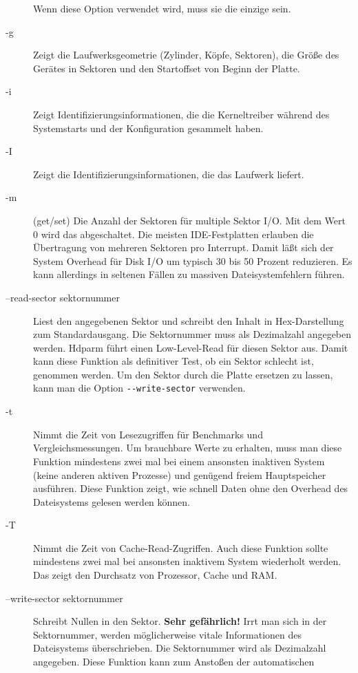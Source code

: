 \begin{normaltext}
\begin{description}
      Wenn diese Option verwendet wird, muss sie die einzige sein.
    \item[-g] Zeigt die Laufwerksgeometrie (Zylinder, Köpfe, Sektoren), die
      Größe des Gerätes in Sektoren und den Startoffset von Beginn der Platte.
    \item[-i] Zeigt Identifizierungsinformationen, die die Kerneltreiber
      während des Systemstarts und der Konfiguration gesammelt haben.
    \item[-I] Zeigt die Identifizierungsinformationen, die das Laufwerk
      liefert.
    \item[-m] (get/set) Die Anzahl der Sektoren für multiple Sektor I/O. Mit
      dem Wert 0 wird das abgeschaltet. Die meisten IDE-Festplatten erlauben
      die Übertragung von mehreren Sektoren pro Interrupt. Damit läßt sich der
      System Overhead für Disk I/O um typisch 30 bis 50 Prozent reduzieren. Es
      kann allerdings in seltenen Fällen zu massiven Dateisystemfehlern
      führen.
    \item[--read-sector sektornummer] Liest den angegebenen Sektor und
      schreibt den Inhalt in Hex-Darstellung zum Standardausgang. Die
      Sektornummer muss als Dezimalzahl angegeben werden. Hdparm führt einen
      Low-Level-Read für diesen Sektor  aus. Damit kann diese Funktion als
      definitiver Test, ob ein Sektor schlecht ist, genommen werden. Um den
      Sektor durch die Platte ersetzen zu lassen, kann man die Option
      \verb?--write-sector? verwenden.
    \item[-t] Nimmt die Zeit von Lesezugriffen für Benchmarks und
      Vergleichsmessungen. Um brauchbare Werte zu erhalten, muss man diese
      Funktion mindestens zwei mal bei einem ansonsten inaktiven System (keine
      anderen aktiven Prozesse) und genügend freiem Hauptspeicher ausführen. 
      Diese Funktion zeigt, wie schnell Daten ohne den Overhead des
      Dateisystems gelesen werden können.
    \item[-T] Nimmt die Zeit von Cache-Read-Zugriffen. Auch diese Funktion
      sollte mindestens zwei mal bei ansonsten inaktivem System wiederholt
      werden. Das zeigt den Durchsatz von Prozessor, Cache und RAM.
    \item[--write-sector sektornummer] Schreibt Nullen in den Sektor. {\bf
      Sehr gefährlich!} Irrt man
      sich in der Sektornummer, werden möglicherweise vitale Informationen des
      Dateisystems überschrieben. Die Sektornummer wird als Dezimalzahl
      angegeben.
      Diese Funktion kann zum Anstoßen der automatischen

\end{description}
\end{normaltext}
